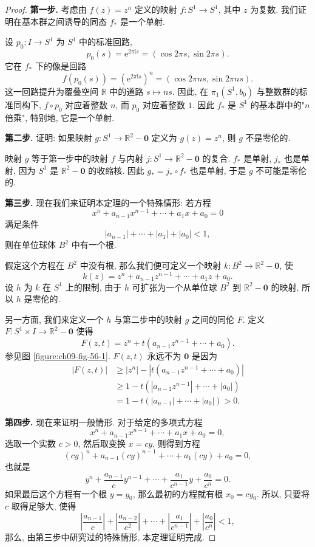 \begin{proof}
\textbf{第一步.} 考虑由 $f(z)=z^n$ 定义的映射 $f\colon S^{1}\to S^{1}$, 其中 $z$ 为复数. 我们证明在基本群之间诱导的同态 $f_*$ 是一个单射.

设 $p_0\colon I\to S^{1}$ 为 $S^{1}$ 中的标准回路,
\[
p_{0}(s)=\mathrm{e}^{2\pi\mathrm{i}s}=(\cos 2\pi s,\sin 2\pi s).
\]
它在 $f_*$ 下的像是回路
\[
f(p_{0}(s))=(\mathrm{e}^{2\pi\mathrm{i}s})^{n}=(\cos 2\pi ns,\sin 2\pi ns).
\]
这一回路提升为覆叠空间 $\mathbb{R}$ 中的道路 $s\mapsto ns$. 因此, 在 $\pi_1(S^{1},b_0)$ 与整数群的标准同构下, $f\circ p_0$ 对应着整数 $n$, 而 $p_0$ 对应着整数 $1$. 因此 $f_*$ 是 $S^{1}$ 的基本群中的"$n$ 倍乘", 特别地, 它是一个单射.

\textbf{第二步.} 证明: 如果映射 $g\colon S^{1}\to\mathbb{R}^{2}-\boldsymbol{0}$ 定义为 $g(z)=z^n$, 则 $g$ 不是零伦的.

映射 $g$ 等于第一步中的映射 $f$ 与内射 $j\colon S^{1}\to\mathbb{R}^{2}-\boldsymbol{0}$ 的复合. $f_*$ 是单射, $j_*$ 也是单射, 因为 $S^{1}$ 是 $\mathbb{R}^{2}-\boldsymbol{0}$ 的收缩核. 因此 $g_*=j_*\circ f_*$ 也是单射, 于是 $g$ 不可能是零伦的.

\textbf{第三步.} 现在我们来证明本定理的一个特殊情形: 若方程
\[
x^{n}+a_{n-1}x^{n-1}+\cdots+a_{1}x+a_{0}=0
\]
满足条件
\[
|a_{n-1}|+\cdots+|a_{1}|+|a_{0}|<1,
\]
则在单位球体 $B^{2}$ 中有一个根.

假定这个方程在 $B^{2}$ 中没有根, 那么我们便可定义一个映射 $k\colon B^{2}\to\mathbb{R}^{2}-\boldsymbol{0}$, 使
\[
k(z)=z^{n}+a_{n-1}z^{n-1}+\cdots+a_{1}z+a_{0}.
\]
设 $h$ 为 $k$ 在 $S^{1}$ 上的限制, 由于 $h$ 可扩张为一个从单位球 $B^{2}$ 到 $\mathbb{R}^{2}-\boldsymbol{0}$ 的映射, 所以 $h$ 是零伦的.

另一方面, 我们来定义一个 $h$ 与第二步中的映射 $g$ 之间的同伦 $F$. 定义 $F\colon S^{1}\times I\to\mathbb{R}^{2}-\boldsymbol{0}$ 使得
\[
F(z,t)=z^{n}+t(a_{n-1}z^{n-1}+\cdots+a_{0}).
\]
参见图 \cref{figure:ch09-fig-56-1}. $F(z,t)$ 永远不为 $\boldsymbol{0}$ 是因为
\[
\begin{aligned}
|F(z,t)|&\geqslant |z^{n}|-|t(a_{n-1}z^{n-1}+\cdots+a_{0})|\\
&\geqslant 1-t(|a_{n-1}z^{n-1}|+\cdots+|a_{0}|)\\
&=1-t(|a_{n-1}|+\cdots+|a_{0}|)>0.
\end{aligned}
\]


\textbf{第四步.} 现在来证明一般情形. 对于给定的多项式方程
\[
x^{n}+a_{n-1}x^{n-1}+\cdots+a_{1}x+a_{0}=0,
\]
选取一个实数 $c>0$, 然后取变换 $x=cy$, 则得到方程
\[
(cy)^{n}+a_{n-1}(cy)^{n-1}+\cdots+a_{1}(cy)+a_{0}=0,
\]
也就是
\[
y^{n}+\frac{a_{n-1}}{c}y^{n-1}+\cdots+\frac{a_{1}}{c^{n-1}}y+\frac{a_{0}}{c^{n}}=0.
\]
如果最后这个方程有一个根 $y=y_0$, 那么最初的方程就有根 $x_0=cy_0$. 所以, 只要将 $c$ 取得足够大, 使得
\[
\left|\frac{a_{n-1}}{c}\right|+\left|\frac{a_{n-2}}{c^{2}}\right|+\cdots+\left|\frac{a_{1}}{c^{n-1}}\right|+\left|\frac{a_{0}}{c^{n}}\right|<1,
\]
那么, 由第三步中研究过的特殊情形, 本定理证明完成.
\end{proof}

